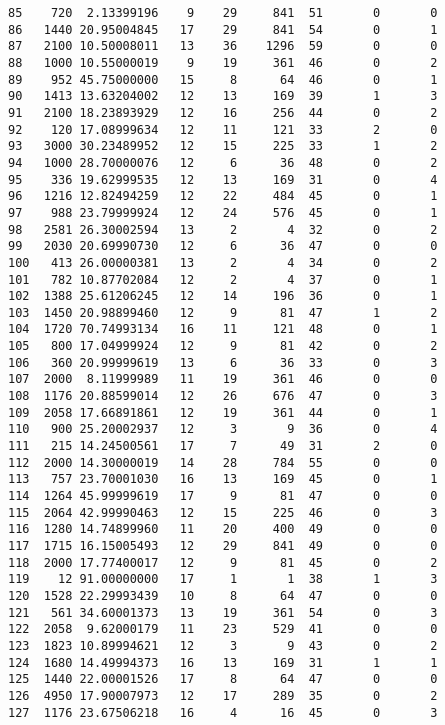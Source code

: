 \documentclass[
  letterpaper,
  DIV=11,
  numbers=noendperiod]{scrreprt}
\begin{document}
\begin{verbatim}
85    720  2.13399196    9    29     841  51       0       0
86   1440 20.95004845   17    29     841  54       0       1
87   2100 10.50008011   13    36    1296  59       0       0
88   1000 10.55000019    9    19     361  46       0       2
89    952 45.75000000   15     8      64  46       0       1
90   1413 13.63204002   12    13     169  39       1       3
91   2100 18.23893929   12    16     256  44       0       2
92    120 17.08999634   12    11     121  33       2       0
93   3000 30.23489952   12    15     225  33       1       2
94   1000 28.70000076   12     6      36  48       0       2
95    336 19.62999535   12    13     169  31       0       4
96   1216 12.82494259   12    22     484  45       0       1
97    988 23.79999924   12    24     576  45       0       1
98   2581 26.30002594   13     2       4  32       0       2
99   2030 20.69990730   12     6      36  47       0       0
100   413 26.00000381   13     2       4  34       0       2
101   782 10.87702084   12     2       4  37       0       1
102  1388 25.61206245   12    14     196  36       0       1
103  1450 20.98899460   12     9      81  47       1       2
104  1720 70.74993134   16    11     121  48       0       1
105   800 17.04999924   12     9      81  42       0       2
106   360 20.99999619   13     6      36  33       0       3
107  2000  8.11999989   11    19     361  46       0       0
108  1176 20.88599014   12    26     676  47       0       3
109  2058 17.66891861   12    19     361  44       0       1
110   900 25.20002937   12     3       9  36       0       4
111   215 14.24500561   17     7      49  31       2       0
112  2000 14.30000019   14    28     784  55       0       0
113   757 23.70001030   16    13     169  45       0       1
114  1264 45.99999619   17     9      81  47       0       0
115  2064 42.99990463   12    15     225  46       0       3
116  1280 14.74899960   11    20     400  49       0       0
117  1715 16.15005493   12    29     841  49       0       0
118  2000 17.77400017   12     9      81  45       0       2
119    12 91.00000000   17     1       1  38       1       3
120  1528 22.29993439   10     8      64  47       0       0
121   561 34.60001373   13    19     361  54       0       3
122  2058  9.62000179   11    23     529  41       0       0
123  1823 10.89994621   12     3       9  43       0       2
124  1680 14.49994373   16    13     169  31       1       1
125  1440 22.00001526   17     8      64  47       0       0
126  4950 17.90007973   12    17     289  35       0       2
127  1176 23.67506218   16     4      16  45       0       3

\end{verbatim}
\end{document}
